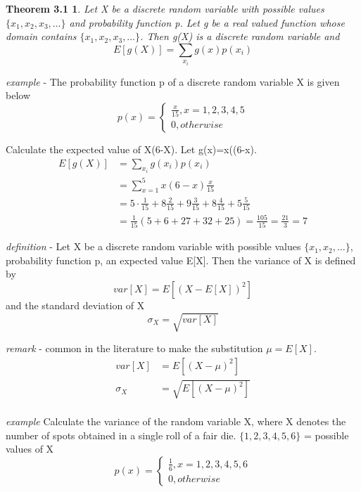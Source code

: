 \documentclass{letter}
\begin{document}
\theoremstyle{nonum}
\newtheorem{threeone}{Theorem 3.1}
\begin{threeone}
Let X be a discrete random variable with possible values $\{x_1, x_2, x_3,\ldots\}$ and 
probability function p. Let g be a real valued function whose domain contains $\{x_1, x_2, x_3,
\ldots\}$. Then g(X) is a discrete random variable and
\[ E[g(X)]=\sum_{x_i} g(x) p(x_i) \]
\end{threeone}
\emph{example} - The probability function p of a discrete random variable X is given below
\[ p(x) = \left\{ 
\begin{array}{l}
\frac{x}{15}, x=1,2,3,4,5 \\
0, otherwise
\end{array} \right. \]


Calculate the expected value of X(6-X). Let g(x)=x((6-x).
\begin{align*}
E[g(X)] & = \sum_{x_i} g(x_i) p(x_i)\\
& = \sum_{x=1}^5 x(6-x) \frac{x}{15}\\
& =5 \cdot \frac{1}{15}+8 \frac{2}{15}+9 \frac{3}{15}+8\frac{4}{15}+5\frac{5}{15}\\
& =\frac{1}{15} (5+6+27+32+25) = \frac{105}{15} = \frac{21}{3} = 7
\end{align*}

\emph{definition} - Let X be a discrete random variable with possible values $\{x_1, x_2, \ldots \}$, probability function p, an expected value E[X]. Then the variance of X is defined by
\[ var[X] = E[(X-E[X])^2] \]
and the standard deviation of X
\[ \sigma_{X} = \sqrt{var[X]} \]

\emph{remark} - common in the literature to make the substitution $\mu = E[X]$.
\begin{align*}
var[X]&=E[(X- \mu)^2]\\
\sigma_{X}&= \sqrt{E[(X- \mu)^2]}\\
\end{align*}

\emph{example} Calculate the variance of the random variable X, where X denotes the number of spots obtained in a single roll of a fair die.
$\{ 1, 2, 3, 4, 5, 6 \}$ = possible values of X\newline
\[ p(x) = \left\{ \begin{array}{l}
\frac{1}{6}, x=1, 2, 3, 4, 5, 6 \\
0, otherwise
\end{array} \right. \]
\end{document}
